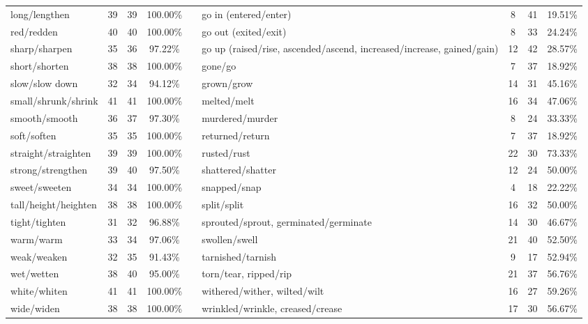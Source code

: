 \begin{tabular}{p{3cm}ccccp{3cm}ccc}
long/lengthen & 39 & 39 & 100.00\% & & go in (entered/enter) & 8 & 41 & 19.51\% \\
red/redden & 40 & 40 & 100.00\% & & go out (exited/exit) & 8 & 33 & 24.24\% \\
sharp/sharpen & 35 & 36 & 97.22\% & & go up (raised/rise, ascended/ascend, increased/increase, gained/gain) & 12 & 42 & 28.57\% \\
short/shorten & 38 & 38 & 100.00\% & & gone/go & 7 & 37 & 18.92\% \\
slow/slow down & 32 & 34 & 94.12\% & & grown/grow & 14 & 31 & 45.16\% \\
small/shrunk/shrink & 41 & 41 & 100.00\% & & melted/melt & 16 & 34 & 47.06\% \\
smooth/smooth & 36 & 37 & 97.30\% & & murdered/murder & 8 & 24 & 33.33\% \\
soft/soften & 35 & 35 & 100.00\% & & returned/return & 7 & 37 & 18.92\% \\
straight/straighten & 39 & 39 & 100.00\% & & rusted/rust & 22 & 30 & 73.33\% \\
strong/strengthen & 39 & 40 & 97.50\% & & shattered/shatter & 12 & 24 & 50.00\% \\
sweet/sweeten & 34 & 34 & 100.00\% & & snapped/snap & 4 & 18 & 22.22\% \\
tall/height/heighten & 38 & 38 & 100.00\% & & split/split & 16 & 32 & 50.00\% \\
tight/tighten & 31 & 32 & 96.88\% & & sprouted/sprout, germinated/germinate & 14 & 30 & 46.67\% \\
warm/warm & 33 & 34 & 97.06\% & & swollen/swell & 21 & 40 & 52.50\% \\
weak/weaken & 32 & 35 & 91.43\% & & tarnished/tarnish & 9 & 17 & 52.94\% \\
wet/wetten & 38 & 40 & 95.00\% & & torn/tear, ripped/rip & 21 & 37 & 56.76\% \\
white/whiten & 41 & 41 & 100.00\% & & withered/wither, wilted/wilt & 16 & 27 & 59.26\% \\
wide/widen & 38 & 38 & 100.00\% & & wrinkled/wrinkle, creased/crease & 17 & 30 & 56.67\%
\end{tabular}